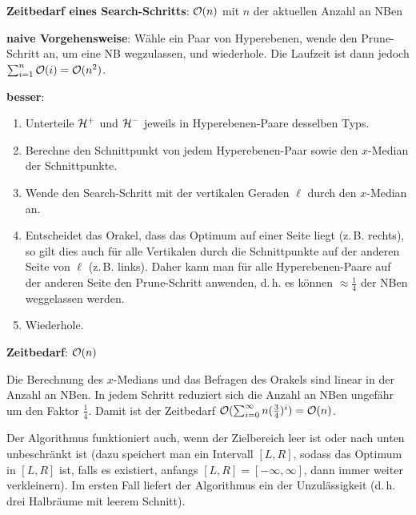 \textbf{Zeitbedarf eines Search-Schritts}:
$\mathcal{O}(n)$ mit $n$ der aktuellen Anzahl an NBen

\linie

\textbf{naive Vorgehensweise}:
Wähle ein Paar von Hyperebenen, wende den Prune-Schritt an, um eine NB wegzulassen, und wiederhole.
Die Laufzeit ist dann jedoch $\sum_{i=1}^n \mathcal{O}(i) = \mathcal{O}(n^2)$.

\textbf{besser}:
\begin{enumerate}
    \item
    Unterteile $\mathcal{H}^+$ und $\mathcal{H}^-$ jeweils in Hyperebenen-Paare desselben Typs.

    \item
    Berechne den Schnittpunkt von jedem Hyperebenen-Paar sowie den $x$-Median der Schnittpunkte.

    \item
    Wende den Search-Schritt mit der vertikalen Geraden $\ell$ durch den $x$-Median an.

    \item
    Entscheidet das Orakel, dass das Optimum auf einer Seite liegt (z.\,B. rechts),
    so gilt dies auch für alle Vertikalen durch die Schnittpunkte auf der anderen Seite von $\ell$
    (z.\,B. links).
    Daher kann man für alle Hyperebenen-Paare auf der anderen Seite den Prune-Schritt anwenden,
    d.\,h. es können $\approx \frac{1}{4}$ der NBen weggelassen werden.

    \item
    Wiederhole.
\end{enumerate}

\textbf{Zeitbedarf}:
$\mathcal{O}(n)$

\begin{Beweis}
    Die Berechnung des $x$-Medians und das Befragen des Orakels sind linear in der Anzahl an NBen.
    In jedem Schritt reduziert sich die Anzahl an NBen ungefähr um den Faktor $\frac{1}{4}$.
    Damit ist der Zeitbedarf $\mathcal{O}(\sum_{i=0}^\infty n (\frac{3}{4})^i) = \mathcal{O}(n)$.
\end{Beweis}

\linie

Der Algorithmus funktioniert auch, wenn der Zielbereich leer ist oder nach unten
unbeschränkt ist (dazu speichert man ein Intervall $[L, R]$, sodass das Optimum in $[L, R]$ ist,
falls es existiert, anfangs $[L, R] = [-\infty, \infty]$, dann immer weiter verkleinern).
Im ersten Fall liefert der Algorithmus ein  der Unzulässigkeit
(d.\,h. drei Halbräume mit leerem Schnitt).

